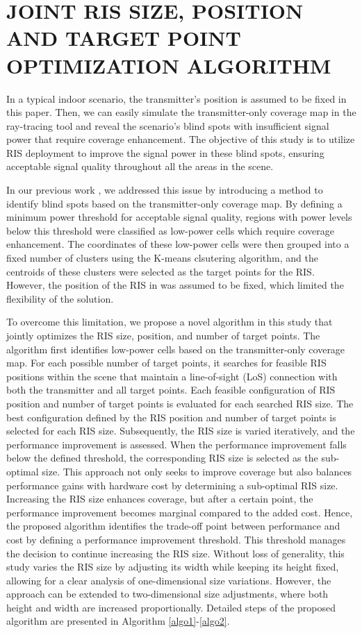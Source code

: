 \documentclass{IEEEoj}
\begin{document}
\section{JOINT RIS SIZE, POSITION AND TARGET POINT OPTIMIZATION ALGORITHM} \label{algo_section}
In a typical indoor scenario, the transmitter's position is assumed to be fixed in this paper. Then, we can easily simulate the transmitter-only coverage map in the ray-tracing tool and reveal the scenario's blind spots with insufficient signal power that require coverage enhancement. The objective of this study is to utilize RIS deployment to improve the signal power in these blind spots, ensuring acceptable signal quality throughout all the areas in the scene.

In our previous work \cite{emre_claude_eucap_paper}, we addressed this issue by introducing a method to identify blind spots based on the transmitter-only coverage map. By defining a minimum power threshold for acceptable signal quality, regions with power levels below this threshold were classified as low-power cells which require coverage enhancement. The coordinates of these low-power cells were then grouped into a fixed number of clusters using the K-means clsutering algorithm, and the centroids of these clusters were selected as the target points for the RIS. However, the position of the RIS in \cite{emre_claude_eucap_paper} was assumed to be fixed, which limited the flexibility of the solution.

To overcome this limitation, we propose a novel algorithm in this study that jointly optimizes the RIS size, position, and number of target points. The algorithm first identifies low-power cells based on the transmitter-only coverage map. For each possible number of target points, it searches for feasible RIS positions within the scene that maintain a line-of-sight (LoS) connection with both the transmitter and all target points. Each feasible configuration of RIS position and number of target points is evaluated for each searched RIS size. The best configuration defined by the RIS position and number of target points is selected for each RIS size. Subsequently, the RIS size is varied iteratively, and the performance improvement is assessed. When the performance improvement falls below the defined threshold, the corresponding RIS size is selected as the sub-optimal size. This approach not only seeks to improve coverage but also balances performance gains with hardware cost by determining a sub-optimal RIS size. Increasing the RIS size enhances coverage, but after a certain point, the performance improvement becomes marginal compared to the added cost. Hence, the proposed algorithm identifies the trade-off point between performance and cost by defining a performance improvement threshold. This threshold manages the decision to continue increasing the RIS size. Without loss of generality, this study varies the RIS size by adjusting its width while keeping its height fixed, allowing for a clear analysis of one-dimensional size variations. However, the approach can be extended to two-dimensional size adjustments, where both height and width are increased proportionally. Detailed steps of the proposed algorithm are presented in Algorithm \ref{algo1}-\ref{algo2}.
\end{document}
